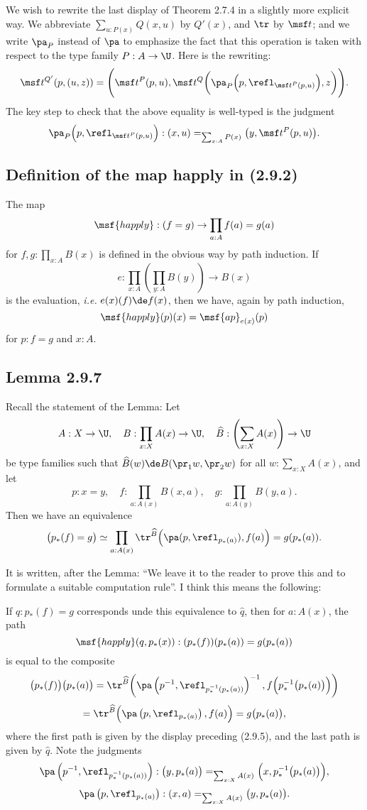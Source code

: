 \documentclass[12pt]{article}
\begin{document}
We wish to rewrite the last display of Theorem 2.7.4 in a slightly more explicit way. We abbreviate $\sum_{u:P(x)}Q(x,u)$ by $Q'(x)$, and $\tr$ by $\msf t$; and we write $\pa_P$ instead of $\pa$ to emphasize the fact that this operation is taken with respect to the type family $P:A\to\U$. Here is the rewriting:
$$
\msf t^{Q'}(p,(u,z))=\Bigg(\msf t^P(p,u),\msf t^Q\bigg(\pa_P\Big(p,\refl_{\msf t^P(p,u)}\Big),z\bigg)\Bigg).
$$ 
The key step to check that the above equality is well-typed is the judgment 
$$
\pa_P\Big(p,\refl_{\msf t^P(p,u)}\Big):(x,u)=_{\sum_{x:A}P(x)}\big(y,\msf t^P(p,u)\big).
$$ 


\subsection{Definition of the map \textsf{happly} in (2.9.2)}

The map 
$$
\msf{happly}:(f=g)\to\prod_{a:A}f(a)=g(a)
$$ 
for $f,g:\prod_{x:A}B(x)$ is defined in the obvious way by path induction. If 
$$
e:\prod_{x:A}\left(\prod_{y:A}B(y)\right)\to B(x)
$$ 
is the evaluation, \emph{i.e.} $e(x)(f)\de f(x)$, then we have, again by path induction, 
$$
\msf{happly}(p)(x)=\msf{ap}_{e(x)}(p)
$$ 
for $p:f=g$ and $x:A$. 


\subsection{Lemma 2.9.7}

Recall the statement of the Lemma: Let 
$$
A:X\to\U,\quad B:\prod_{x:X}A(x)\to\U,\quad\widehat B:\left(\sum_{x:X}A(x)\right)\to\U
$$ 
be type families such that $\widehat B(w)\de B(\pr_1w,\pr_2w)$ for all $w:\sum_{x:X}A(x)$, and let 
$$
p:x=y,\quad f:\prod_{a:A(x)}B(x,a),\quad g:\prod_{a:A(y)}B(y,a).
$$ 
Then we have an equivalence 
$$
\big(p_*(f)=g\big)\simeq\prod_{a:A(x)}\tr^{\widehat B}\Big(\pa(p,\refl_{p_*(a)}),f(a)\Big)=g(p_*(a)).
$$ 

It is written, after the Lemma: ``We leave it to the reader to prove this and to formulate a suitable computation rule''. I think this means the following:

If $q:p_*(f)=g$ corresponds unde this equivalence to $\widehat q$, then for $a:A(x)$, the path 
$$
\msf{happly}(q,p_*(x)):(p_*(f))(p_*(a))=g(p_*(a))
$$ 
is equal to the composite 
$$
\big(p_*(f)\big)\big(p_*(a)\big)=
\tr^{\widehat B}\bigg(\pa\left(p^{-1},\refl_{p^{-1}_*(p_*(a))}\right)^{-1},f\Big(p^{-1}_*\big(p_*(a)\big)\Big)\bigg)
$$
$$
=\tr^{\widehat B}\Big(\pa\left(p,\refl_{p_*(a)}\right),f(a)\Big)=g\big(p_*(a)\big),
$$ 
where the first path is given by the display preceding (2.9.5), and the last path is given by $\widehat q$. Note the judgments
$$
\pa\left(p^{-1},\refl_{p^{-1}_*(p_*(a))}\right):\big(y,p_*(a)\big)=_{\sum_{x:X}A(x)}\Big(x,p^{-1}_*\big(p_*(a)\big)\Big),
$$ 
$$
\pa\left(p,\refl_{p_*(a)}\right):(x,a)=_{\sum_{x:X}A(x)}\big(y,p_*(a)\big).
$$
\end{document}
